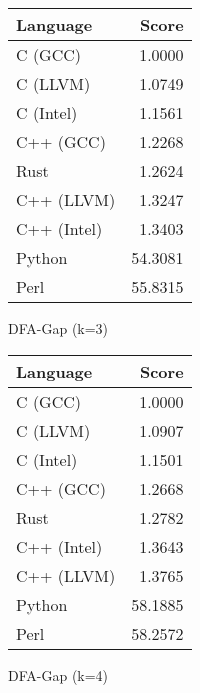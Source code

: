 \begin{subtable}{0.33\textwidth}
    \centering
    \begin{tabular}{|l|r|}
        \hline
        Language & Score \\
        \hline
        C (GCC) & 1.0000 \\
        C (LLVM) & 1.0749 \\
        C (Intel) & 1.1561 \\
        C++ (GCC) & 1.2268 \\
        Rust & 1.2624 \\
        C++ (LLVM) & 1.3247 \\
        C++ (Intel) & 1.3403 \\
        Python & 54.3081 \\
        Perl & 55.8315 \\
        \hline
    \end{tabular}
    \caption{DFA-Gap (k=3)}
    \label{table:runtime:dfa_gap(3)}
\end{subtable}%
\begin{subtable}{0.33\textwidth}
    \centering
    \begin{tabular}{|l|r|}
        \hline
        Language & Score \\
        \hline
        C (GCC) & 1.0000 \\
        C (LLVM) & 1.0907 \\
        C (Intel) & 1.1501 \\
        C++ (GCC) & 1.2668 \\
        Rust & 1.2782 \\
        C++ (Intel) & 1.3643 \\
        C++ (LLVM) & 1.3765 \\
        Python & 58.1885 \\
        Perl & 58.2572 \\
        \hline
    \end{tabular}
    \caption{DFA-Gap (k=4)}
    \label{table:runtime:dfa_gap(4)}
\end{subtable}%
